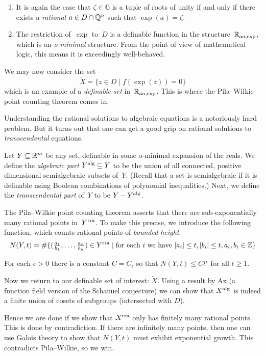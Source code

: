 \documentclass[10pt, a4paper]{amsart}
\begin{document}
\begin{enumerate}
  \item It is again the case that $\zeta \in \mathbb G$ is a tuple of roots of unity
    if and only if there exists a \emph{rational} $a \in D \cap \mathbb{Q}^n$ such that $\exp(a) = \zeta$.
  \item The restriction of~$\exp$ to~$D$ is a definable function in the structure~$\mathbb{R}_{\mathrm{an},\exp}$,
    which is an \emph{o-minimal} structure.
    From the point of view of mathematical logic, this means it is exceedingly well-behaved.
\end{enumerate}

We may now consider the set
\[ \tilde X = \{ z \in D \mid f(\exp(z)) = 0 \} \]
which is an example of a \emph{definable set} in~$\mathbb{R}_{\mathrm{an},\exp}$.
This is where the Pila--Wilkie point counting theorem comes in.

Understanding the rational solutions to algebraic equations is a notoriously hard problem.
But it turns out that one can get a good grip on rational solutions to \emph{transcendental} equations.

Let $Y \subseteq \mathbb{R}^m$ be any set, definable in some o-minimal expansion of the reals.
We define the \emph{algebraic part} $Y^{\mathrm{alg}} \subseteq Y$ to be
the union of all connected, positive dimensional semialgebraic subsets of~$Y$.
(Recall that a set is semialgebraic if it is definable using Boolean combinations of polynomial inequalities.)
Next, we define the \emph{transcendental part} of~$Y$ to be $Y - Y^{\mathrm{alg}}$.

The Pila--Wilkie point counting theorem asserts that there are sub-exponentially many rational points in~$Y^{\mathrm{tra}}$.
To make this precise, we introduce the following function,
which counts rational points of \emph{bounded height}:
\[
  N(Y,t) = \# \{ (\tfrac{a_1}{b_1}, \dots, \tfrac{a_n}{b_n}) \in Y^{\mathrm{tra}} \mid
  \text{for each $i$ we have }
  |a_i| \le t, |b_i| \le t, a_i, b_i \in \mathbb{Z} \}
\]

\begin{theorem}
  For each $\epsilon > 0$ there is a constant $C = C_\epsilon$
  so that $N(Y, t) \le Ct^\epsilon$ for all $t \ge 1$.
\end{theorem}

Now we return to our definable set of interest: $\tilde X$.
Using a result by Ax (a function field version of the Schanuel conjecture)
we can show that $\tilde X^{\mathrm{alg}}$ is indeed a finite union of cosets of subgroups
(intersected with $D$).

Hence we are done if we show that $\tilde X^{\mathrm{tra}}$ only has finitely many rational points.
This is done by contradiction.
If there are infinitely many points,
then one can use Galois theory
to show that $N(Y, t)$ must exhibit exponential growth.
This contradicts Pila--Wilkie, so we win.
\end{document}
